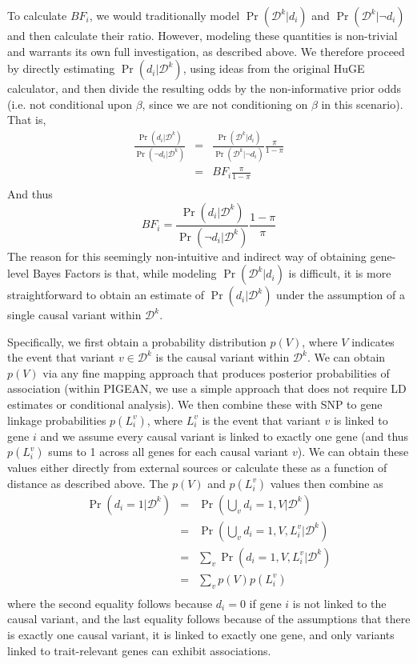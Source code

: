 To calculate $BF_i$, we would traditionally model
$\Pr\left(\mathcal{D}^k|d_i\right)$ and
$\Pr\left(\mathcal{D}^k|\neg d_i\right)$ and then calculate their ratio. However, modeling these quantities is
non-trivial and warrants its own full investigation, as described
above. We therefore proceed by directly estimating
$\Pr\left(d_i|\mathcal{D}^k\right)$, using ideas from the original
HuGE calculator\cite{}, and then divide the resulting odds by the
non-informative prior odds (i.e. not conditional upon $\beta$, since
we are not conditioning on $\beta$ in this scenario). That is, 
\begin{eqnarray*}
\frac{\Pr\left(d_i|\mathcal{D}^k\right)}{\Pr\left(\neg d_i|\mathcal{D}^k\right)} & = &
\frac{\Pr\left(\mathcal{D}^k|d_i\right)}{\Pr\left(\mathcal{D}^k|\neg d_i\right)}\frac{\pi}{1-\pi} \\
& = & BF_i \frac{\pi}{1-\pi} \\
\end{eqnarray*}
And thus
\[BF_i = \frac{\Pr\left(d_i|\mathcal{D}^k\right)}{\Pr\left(\neg
  d_i|\mathcal{D}^k\right)} \frac{1-\pi}{\pi}\]
The reason for this seemingly non-intuitive and indirect way of
obtaining gene-level Bayes Factors is that, while modeling
$\Pr\left(\mathcal{D}^k|d_i\right)$ is difficult, it is more
straightforward to obtain an estimate of 
$\Pr\left(d_i|\mathcal{D}^k\right)$ under the assumption of a single
causal variant within $\mathcal{D}^k$.

Specifically, we first obtain a probability
distribution $p(V)$, where $V$ indicates the event that variant $v
\in \mathcal{D}^k$ is the causal variant within $\mathcal{D}^k$. We can
obtain $p(V)$ via any fine mapping approach that produces posterior
probabilities of association (within PIGEAN, we use a simple approach
that does not require LD estimates or conditional analysis\cite{}). We
then combine these with SNP to gene linkage probabilities $p(L^v_i)$, where $L^v_i$
is the event that variant $v$ is linked to gene $i$ and we assume
every causal variant is linked to exactly one gene (and thus $p(L^v_i)$
sums to 1 across all genes for each causal variant $v$). We can obtain
these values either directly from external sources or calculate these
as a function of distance as described above. The $p(V)$ and
$p(L^v_i)$ values then combine as
\begin{eqnarray*}
\Pr\left(d_i=1|\mathcal{D}^k\right) & = &
\Pr\left(\bigcup_v d_i=1,V|\mathcal{D}^k\right) \\
&=& \Pr\left(\bigcup_v d_i=1,V,L^v_i|\mathcal{D}^k\right) \\
&=& \sum_v \Pr\left(d_i=1,V,L^v_i|\mathcal{D}^k\right) \\
&=& \sum_v p(V)p(L^v_i) \\
\end{eqnarray*}
where the second equality follows because $d_i=0$ if gene $i$ is not linked
to the causal variant, and the last equality follows because of the
assumptions that there is exactly one causal variant, it is linked
to exactly one gene, and only variants linked to trait-relevant genes
can exhibit associations.

